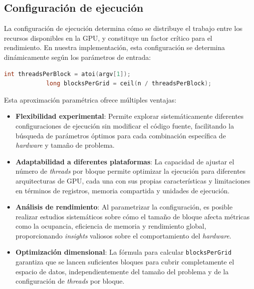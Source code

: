     \subsection{Configuración de ejecución}
    
        La configuración de ejecución determina cómo se distribuye el trabajo entre los recursos disponibles en la GPU, y constituye un factor crítico para el rendimiento. En nuestra implementación, esta configuración se determina dinámicamente según los parámetros de entrada:
        
        \begin{lstlisting}[language=C, caption={Calculo de las dimensiones del bloque y grid.}, gobble=12]
            int threadsPerBlock = atoi(argv[1]);
            long blocksPerGrid = ceil(n / threadsPerBlock);
        \end{lstlisting}
        
        Esta aproximación paramétrica ofrece múltiples ventajas:
    
        \begin{itemize}
        
            \item \textbf{Flexibilidad experimental}: Permite explorar sistemáticamente diferentes configuraciones de ejecución sin modificar el código fuente, facilitando la búsqueda de parámetros óptimos para cada combinación específica de \textit{hardware} y tamaño de problema.
            
            \item \textbf{Adaptabilidad a diferentes plataformas}: La capacidad de ajustar el número de \textit{threads} por bloque permite optimizar la ejecución para diferentes arquitecturas de GPU, cada una con sus propias características y limitaciones en términos de registros, memoria compartida y unidades de ejecución.
            
            \item \textbf{Análisis de rendimiento}: Al parametrizar la configuración, es posible realizar estudios sistemáticos sobre cómo el tamaño de bloque afecta métricas como la ocupancia, eficiencia de memoria y rendimiento global, proporcionando \textit{insights} valiosos sobre el comportamiento del \textit{hardware}.
            
            \item \textbf{Optimización dimensional}: La fórmula para calcular \texttt{blocksPerGrid} garantiza que se lancen suficientes bloques para cubrir completamente el espacio de datos, independientemente del tamaño del problema y de la configuración de \textit{threads} por bloque.
            
        \end{itemize}
        
